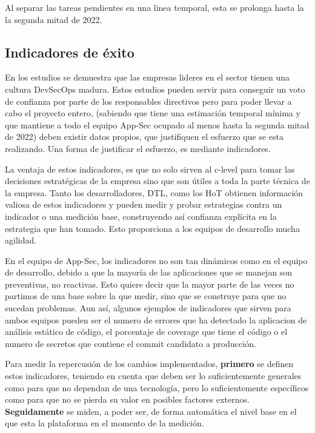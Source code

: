 \documentclass[12pt]{report} %
\begin{document}
Al separar las tareas pendientes en una linea temporal, esta se prolonga hasta la
la segunda mitad de 2022.


\subsection{Indicadores de éxito}


En los estudios se demuestra que las empresas lideres en el sector tienen una cultura
\gls{DevSecOps} madura. %
Estos estudios pueden servir para conseguir un voto de confianza por parte de los
responsables directivos pero para poder llevar a cabo el proyecto entero,
(sabiendo que tiene una estimación temporal mínima y que mantiene a todo el equipo
\gls{App-Sec} ocupado al menos hasta la segunda mitad de 2022) deben existir
datos propios, que justifiquen el esfuerzo que se esta realizando.
Una forma de justificar el esfuerzo, es mediante indicadores.

La ventaja de estos indicadores, es que no solo sirven al \gls{c-level} para
tomar las decisiones estratégicas de la empresa sino que son útiles a toda la
parte técnica de la empresa.
Tanto los desarrolladores, \gls{DTL}, como los \gls{HoT} obtienen
información valiosa de estos indicadores y pueden medir y probar estrategias
contra un indicador o una medición base, construyendo así confianza explícita en
la estrategia que han tomado.
Esto proporciona a los equipos de desarrollo mucha agilidad.

En el equipo de \gls{App-Sec}, los indicadores no son tan dinámicos como en el
equipo de desarrollo, debido a que la mayoría de las aplicaciones que se manejan
son preventivas, no reactivas.
Esto quiere decir que la mayor parte de las veces no partimos de una base sobre
la que medir, sino que se construye para que no sucedan problemas.
Aun así, algunos ejemplos de indicadores que sirven para ambos equipos pueden
ser el numero de errores que ha detectado la aplicacion de análisis estático de
código, el porcentaje de \gls{coverage} que tiene el código o el numero de
secretos que contiene el \gls{commit} candidato a producción.

Para medir la repercusión de los cambios implementados, \textbf{primero} se definen estos
indicadores, teniendo en cuenta que deben ser lo suficientemente generales como
para que no dependan de una tecnología, pero lo suficientemente específicos
como para que no se pierda su valor en posibles factores externos.
\textbf{Seguidamente} se miden, a poder ser, de forma automática el nivel base en el
que esta la plataforma en el momento de la medición.
\end{document}
